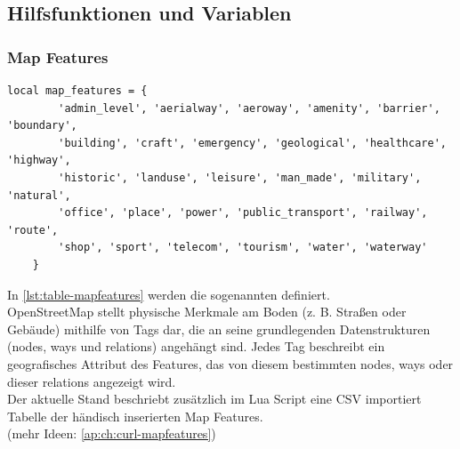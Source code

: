\subsection{Hilfsfunktionen und Variablen}
\subsubsection{Map Features}
\begin{lstlisting}[language={[5.0]Lua}, caption={Deklaration einer Lua Tabelle für die mapfeatures},label={lst:table-mapfeatures}]
	local map_features = {
		'admin_level', 'aerialway', 'aeroway', 'amenity', 'barrier', 'boundary',
		'building', 'craft', 'emergency', 'geological', 'healthcare', 'highway',
		'historic', 'landuse', 'leisure', 'man_made', 'military', 'natural',
		'office', 'place', 'power', 'public_transport', 'railway', 'route',
		'shop', 'sport', 'telecom', 'tourism', 'water', 'waterway'
	}
\end{lstlisting}
In \autoref{lst:table-mapfeatures} werden die sogenannten \cite{osm-mapfeatures} definiert. \\
OpenStreetMap stellt physische Merkmale am Boden (z. B. Straßen oder Gebäude) mithilfe von Tags dar, die an seine grundlegenden Datenstrukturen (nodes, ways und relations) angehängt sind. Jedes Tag beschreibt ein geografisches Attribut des Features, das von diesem bestimmten nodes, ways oder dieser relations angezeigt wird.\\

Der aktuelle Stand beschriebt zusätzlich im Lua Script eine CSV importiert Tabelle der händisch inserierten Map Features. \\(mehr Ideen: \autoref{ap:ch:curl-mapfeatures})


